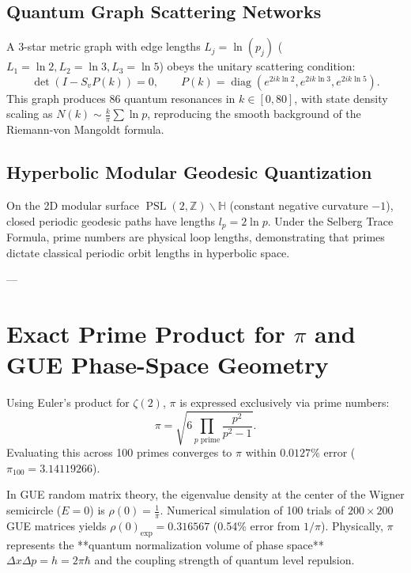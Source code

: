 \documentclass[11pt,a4paper]{article}
\begin{document}
\subsection{Quantum Graph Scattering Networks}
A 3-star metric graph with edge lengths $L_j = \ln(p_j)$ ($L_1 = \ln 2, L_2 = \ln 3, L_3 = \ln 5$) obeys the unitary scattering condition:
\begin{equation}
\operatorname{det}\left( I - S_v P(k) \right) = 0, \qquad P(k) = \operatorname{diag}\left(e^{2i k \ln 2}, e^{2i k \ln 3}, e^{2i k \ln 5}\right).
\end{equation}
This graph produces 86 quantum resonances in $k \in [0, 80]$, with state density scaling as $N(k) \sim \frac{k}{\pi} \sum \ln p$, reproducing the smooth background of the Riemann-von Mangoldt formula.

\subsection{Hyperbolic Modular Geodesic Quantization}
On the 2D modular surface $\operatorname{PSL}(2, \mathbb{Z}) \backslash \mathbb{H}$ (constant negative curvature $-1$), closed periodic geodesic paths have lengths $l_p = 2 \ln p$. Under the Selberg Trace Formula, prime numbers are physical loop lengths, demonstrating that primes dictate classical periodic orbit lengths in hyperbolic space.

---

\section{Exact Prime Product for \texorpdfstring{$\pi$}{pi} and GUE Phase-Space Geometry}

Using Euler's product for $\zeta(2)$, $\pi$ is expressed exclusively via prime numbers:
\begin{equation}
\pi = \sqrt{6 \prod_{p \text{ prime}} \frac{p^2}{p^2 - 1}}.
\end{equation}
Evaluating this across 100 primes converges to $\pi$ within $0.0127\%$ error ($\pi_{100} = 3.14119266$).

In GUE random matrix theory, the eigenvalue density at the center of the Wigner semicircle ($E = 0$) is $\rho(0) = \frac{1}{\pi}$. Numerical simulation of 100 trials of $200 \times 200$ GUE matrices yields $\rho(0)_{\text{exp}} = 0.316567$ (0.54\% error from $1/\pi$). Physically, $\pi$ represents the **quantum normalization volume of phase space** $\Delta x \Delta p = h = 2\pi\hbar$ and the coupling strength of quantum level repulsion.
\end{document}
